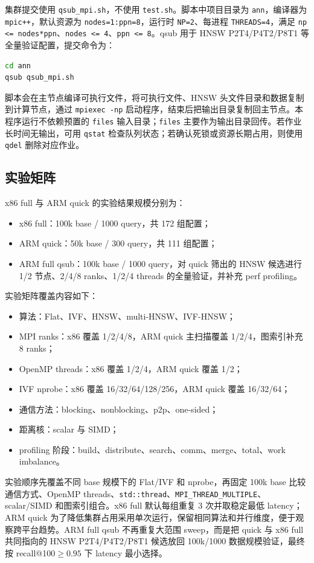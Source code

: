 \documentclass[11pt,a4paper]{article}
\begin{document}
集群提交使用 \texttt{qsub\_mpi.sh}，不使用 \texttt{test.sh}。脚本中项目目录为 \texttt{ann}，编译器为 \texttt{mpic++}，默认资源为 \texttt{nodes=1:ppn=8}，运行时 \texttt{NP=2}、每进程 \texttt{THREADS=4}，满足 \texttt{np <= nodes*ppn}、\texttt{nodes <= 4}、\texttt{ppn <= 8}。qsub 用于 HNSW P2T4/P4T2/P8T1 等全量验证配置，提交命令为：
\begin{lstlisting}[language=bash]
cd ann
qsub qsub_mpi.sh
\end{lstlisting}
脚本会在主节点编译可执行文件，将可执行文件、HNSW 头文件目录和数据复制到计算节点，通过 \texttt{mpiexec -np} 启动程序，结束后把输出目录复制回主节点。本程序运行不依赖预置的 \texttt{files} 输入目录；\texttt{files} 主要作为输出目录回传。若作业长时间无输出，可用 \texttt{qstat} 检查队列状态；若确认死锁或资源长期占用，则使用 \texttt{qdel} 删除对应作业。

\subsection{实验矩阵}

x86 full 与 ARM quick 的实验结果规模分别为：
\begin{itemize}
    \item x86 full：100k base / 1000 query，共 172 组配置；
    \item ARM quick：50k base / 300 query，共 111 组配置；
    \item ARM full qsub：100k base / 1000 query，对 quick 筛出的 HNSW 候选进行 1/2 节点、2/4/8 ranks、1/2/4 threads 的全量验证，并补充 perf profiling。
\end{itemize}
实验矩阵覆盖内容如下：
\begin{itemize}
    \item 算法：Flat、IVF、HNSW、multi-HNSW、IVF-HNSW；
    \item MPI ranks：x86 覆盖 1/2/4/8，ARM quick 主扫描覆盖 1/2/4，图索引补充 8 ranks；
    \item OpenMP threads：x86 覆盖 1/2/4，ARM quick 覆盖 1/2；
    \item IVF nprobe：x86 覆盖 16/32/64/128/256，ARM quick 覆盖 16/32/64；
    \item 通信方法：blocking、nonblocking、p2p、one-sided；
    \item 距离核：scalar 与 SIMD；
    \item profiling 阶段：build、distribute、search、comm、merge、total、work imbalance。
\end{itemize}

实验顺序先覆盖不同 base 规模下的 Flat/IVF 和 nprobe，再固定 100k base 比较通信方式、OpenMP threads、\texttt{std::thread}、\texttt{MPI\_THREAD\_MULTIPLE}、scalar/SIMD 和图索引组合。x86 full 默认每组重复 3 次并取稳定最低 latency；ARM quick 为了降低集群占用采用单次运行，保留相同算法和并行维度，便于观察跨平台趋势。ARM full qsub 不再重复大范围 sweep，而是把 quick 与 x86 full 共同指向的 HNSW P2T4/P4T2/P8T1 候选放回 100k/1000 数据规模验证，最终按 recall@100$\ge0.95$ 下 latency 最小选择。
\end{document}
